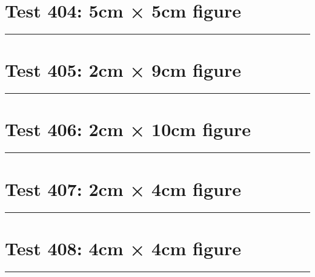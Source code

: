 \documentclass[a4paper,11pt]{article}
\begin{document}
\section*{Test 404: 5cm × 5cm figure}
\begin{swarmwrap}%
  \begin{minipage}[t]{5cm}
    \centering
    \rule{\linewidth}{5cm}
  \end{minipage}%
\end{swarmwrap}%
\swarmwrapnext
\lipsum[66]
\lipsum[67]
\lipsum[68]
\lipsum[69]
\section*{Test 405: 2cm × 9cm figure}
\begin{swarmwrap}%
  \begin{minipage}[t]{2cm}
    \centering
    \rule{\linewidth}{9cm}
  \end{minipage}%
\end{swarmwrap}%
\swarmwrapnext
\lipsum[143]
\lipsum[144]
\lipsum[145]
\lipsum[146]
\lipsum[147]
\section*{Test 406: 2cm × 10cm figure}
\begin{swarmwrap}%
  \begin{minipage}[t]{2cm}
    \centering
    \rule{\linewidth}{10cm}
  \end{minipage}%
\end{swarmwrap}%
\swarmwrapnext
\lipsum[74]
\lipsum[75]
\lipsum[76]
\section*{Test 407: 2cm × 4cm figure}
\begin{swarmwrap}%
  \begin{minipage}[t]{2cm}
    \centering
    \rule{\linewidth}{4cm}
  \end{minipage}%
\end{swarmwrap}%
\swarmwrapnext
\lipsum[117]
\lipsum[118]
\lipsum[119]
\lipsum[120]
\lipsum[121]
\section*{Test 408: 4cm × 4cm figure}
\begin{swarmwrap}%
  \begin{minipage}[t]{4cm}
    \centering
    \rule{\linewidth}{4cm}
  \end{minipage}%
\end{swarmwrap}%
\swarmwrapnext
\lipsum[25]
\lipsum[26]
\lipsum[27]
\lipsum[28]
\lipsum[29]
\lipsum[30]
\end{document}
